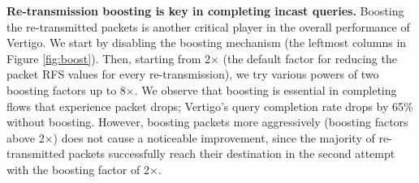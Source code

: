 \textbf{Re-transmission boosting is key in completing incast queries.}
Boosting the re-transmitted packets is another critical player in the overall performance of Vertigo.
We start by disabling the boosting mechanism (the leftmost columns in Figure \ref{fig:boost}). Then, starting from 2$\times$ (the default factor for reducing the packet RFS values for every re-transmission), we try various powers of two boosting factors up to 8$\times$. We observe that boosting is essential in completing flows that experience packet drops; Vertigo's query completion rate drops by 65\% without boosting. 
However, boosting packets more aggressively (boosting factors above 2$\times$) does not cause a noticeable improvement, since the majority of re-transmitted packets successfully reach their destination in the second attempt with the boosting factor of 2$\times$.


